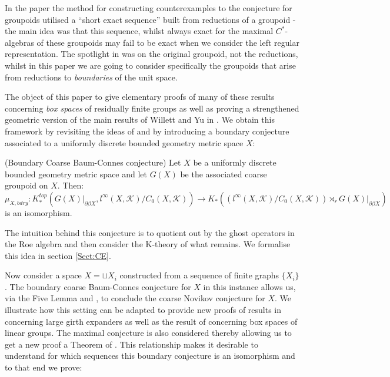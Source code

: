 In the paper \cite{MR1911663} the method for constructing counterexamples to the conjecture for groupoids utilised a ``short exact sequence'' built from reductions of a groupoid -the main idea was that this sequence, whilst always exact for the maximal $C^{*}$-algebras of these groupoids may fail to be exact when we consider the left regular representation. The spotlight in \cite{MR1911663} was on the original groupoid, not the reductions, whilst in this paper we are going to consider specifically the groupoids that arise from reductions to \textit{boundaries} of the unit space. 

The object of this paper to give elementary proofs of many of these results concerning \textit{box spaces} of residually finite groups as well as proving a strengthened geometric version of the main results of Willett and Yu in \cite{explg1,explg2}. We obtain this framework by revisiting the ideas of \cite{MR1911663,MR1905840} and by introducing a boundary conjecture associated to a uniformly discrete bounded geometry metric space $X$:
\begin{conjecture}(Boundary Coarse Baum-Connes conjecture)\label{MC:S1}
Let $X$ be a uniformly discrete bounded geometry metric space and let $G(X)$ be the associated coarse groupoid on $X$. Then:
\begin{equation*}
\mu_{X,bdry}:K_{*}^{top}(G(X)|_{\partial\beta X}, l^{\infty}(X,\mathcal{K})/C_{0}(X,\mathcal{K})) \rightarrow K_{*}((l^{\infty}(X,\mathcal{K})/C_{0}(X,\mathcal{K}))\rtimes_{r}G(X)|_{\partial\beta X})
\end{equation*}
is an isomorphism.
\end{conjecture}

The intuition behind this conjecture is to quotient out by the ghost operators in the Roe algebra and then consider the K-theory of what remains. We formalise this idea in section \ref{Sect:CE}.

Now consider a space $X = \sqcup X_{i}$ constructed from a sequence of finite graphs $\lbrace X_{i}\rbrace$. The boundary coarse Baum-Connes conjecture for $X$ in this instance allows us, via the Five Lemma and \cite[Lemma 9]{MR1905840}, to conclude the coarse Novikov conjecture for $X$. We illustrate how this setting can be adapted to provide new proofs of results in \cite{explg1} concerning large girth expanders as well as the result of \cite[Theorem 5.7]{MR2764895} concerning box spaces of linear groups. The maximal conjecture is also considered thereby allowing us to get a new proof a Theorem of \cite{MR2431253,MR2419930,MR2568691}. This relationship makes it desirable to understand for which sequences this boundary conjecture is an isomorphism and to that end we prove:

